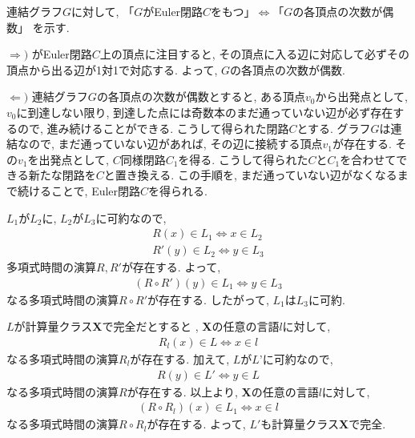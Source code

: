 \begin{ex}
    \label{ex3.20}
    連結グラフ$G$に対して,
    「$G$がEuler閉路$C$をもつ」$\Longleftrightarrow$「$G$の各頂点の次数が偶数」
    を示す.
    \par
    $\Longrightarrow)$
    がEuler閉路$C$上の頂点に注目すると, その頂点に入る辺に対応して必ずその頂点から出る辺が1対1で対応する. よって, $G$の各頂点の次数が偶数.
    \par
    $\Longleftarrow)$
    連結グラフ$G$の各頂点の次数が偶数とすると, ある頂点$v_0$から出発点として, $v_0$に到達しない限り, 到達した点には奇数本のまだ通っていない辺が必ず存在するので, 進み続けることができる. こうして得られた閉路$C$とする. グラフ$G$は連結なので, まだ通っていない辺があれば, その辺に接続する頂点$v_1$が存在する. その$v_1$を出発点として, $C$同様閉路$C_1$を得る. こうして得られた$C$と$C_1$を合わせてできる新たな閉路を$C$と置き換える. この手順を, まだ通っていない辺がなくなるまで続けることで, Euler閉路$C$を得られる.
\end{ex}

\begin{ex}
    \label{ex3.21}
    $L_1$が$L_2$に, $L_2$が$L_3$に可約なので,
    \begin{align*}
        R(x) \in L_1 \Longleftrightarrow x \in L_2 \\
        R'(y) \in L_2 \Longleftrightarrow y \in L_3
    \end{align*}
    多項式時間の演算$R,R'$が存在する. よって,
    \begin{align*}
        (R\circ R')(y) \in L_1 \Longleftrightarrow y \in L_3
    \end{align*}
    なる多項式時間の演算$R\circ R'$が存在する.
    したがって, $L_1$は$L_3$に可約.
\end{ex}

\begin{ex}
    \label{ex3.22}
    $L$が計算量クラス{\bf X}で完全だとすると
    ,
    {\bf X}の任意の言語$l$に対して,
    \begin{align*}
        R_l(x) \in L \Longleftrightarrow x \in l
    \end{align*}
    なる多項式時間の演算$R_l$が存在する. 加えて, $L$が$L’$に可約なので,
    \begin{align*}
        R(y) \in L' \Longleftrightarrow y \in L
    \end{align*}
    なる多項式時間の演算$R$が存在する. 以上より, {\bf X}の任意の言語$l$に対して,
    \begin{align*}
        (R\circ R_l)(x) \in L_1 \Longleftrightarrow x \in l
    \end{align*}
    なる多項式時間の演算$R\circ R_l$が存在する. よって, $L'$も計算量クラス{\bf X}で完全.
\end{ex}

